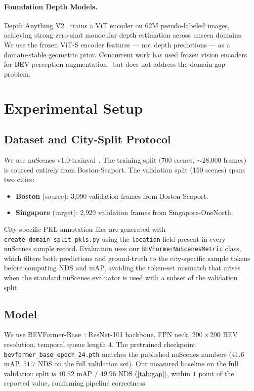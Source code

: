 \documentclass[letterpaper, 10pt, journal]{IEEEtran}
\begin{document}
\paragraph{Foundation Depth Models.}
Depth Anything V2~\cite{yang2024depthanythingv2} trains a ViT encoder on 62M
pseudo-labeled images, achieving strong zero-shot monocular depth estimation across
unseen domains.
We use the frozen ViT-S encoder features --- not depth predictions --- as a
domain-stable geometric prior.
Concurrent work has used frozen vision encoders for BEV perception
augmentation~\cite{xu2023vlm3det} but does not address the domain gap problem.

\section{Experimental Setup}
\label{sec:setup}

\subsection{Dataset and City-Split Protocol}

We use nuScenes v1.0-trainval~\cite{caesar2020nuscenes}.
The training split (700 scenes, $\sim$28{,}000 frames) is sourced entirely from
Boston-Seaport.
The validation split (150 scenes) spans two cities:
\begin{itemize}
  \item \textbf{Boston} (source): 3{,}090 validation frames from Boston-Seaport.
  \item \textbf{Singapore} (target): 2{,}929 validation frames from
        Singapore-OneNorth.
\end{itemize}
City-specific PKL annotation files are generated with \texttt{create\_domain\_split\_pkls.py}
using the \texttt{location} field present in every nuScenes sample record.
Evaluation uses our \texttt{BEVFormerNuScenesMetric} class, which filters both
predictions and ground-truth to the city-specific sample tokens before computing NDS
and mAP, avoiding the token-set mismatch that arises when the standard nuScenes
evaluator is used with a subset of the validation split.

\subsection{Model}

We use BEVFormer-Base~\cite{li2022bevformer}: ResNet-101 backbone, FPN neck,
$200{\times}200$ BEV resolution, temporal queue length 4.
The pretrained checkpoint \texttt{bevformer\_base\_epoch\_24.pth} matches the
published nuScenes numbers ($41.6$ mAP, $51.7$ NDS on the full validation set).
Our measured baseline on the full validation split is $40.52$ mAP / $49.96$ NDS
(\cref{tab:gap}), within $1$ point of the reported value, confirming pipeline
correctness.
\end{document}
